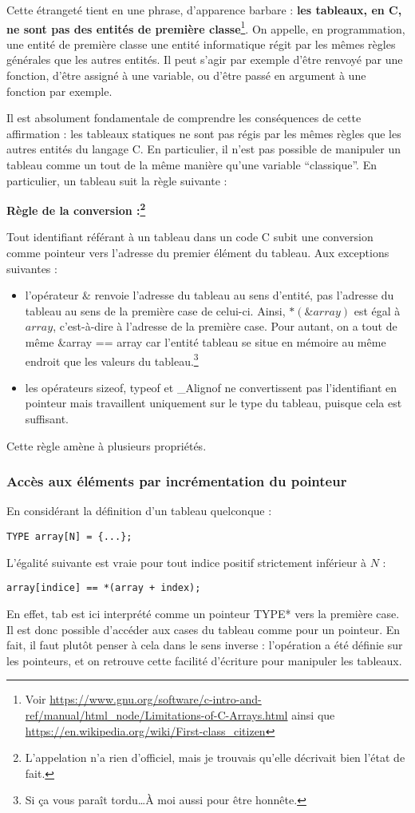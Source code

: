 \documentclass[../../../main.tex]{subfiles}
\begin{document}
Cette étrangeté tient en une phrase, d'apparence barbare : \textbf{les tableaux, en C, ne sont pas des entités de première classe}\footnote{Voir \url{https://www.gnu.org/software/c-intro-and-ref/manual/html_node/Limitations-of-C-Arrays.html} ainsi que \url{https://en.wikipedia.org/wiki/First-class_citizen}}. On appelle, en programmation, une entité de première classe une entité informatique régit par les mêmes règles générales que les autres entités. Il peut s'agir par exemple d'être renvoyé par une fonction, d'être assigné à une variable, ou d'être passé en argument à une fonction par exemple.
 
Il est absolument fondamentale de comprendre les conséquences de cette affirmation : les tableaux statiques ne sont pas régis par les mêmes règles que les autres entités du langage C. En particulier, il n'est pas possible de manipuler un tableau comme un tout de la même manière qu'une variable ``classique''. En particulier, un tableau suit la règle suivante :
 
\textbf{Règle de la conversion :\footnote{L'appelation n'a rien d'officiel, mais je trouvais qu'elle décrivait bien l'état de fait.}}
 
Tout identifiant référant à un tableau dans un code C subit une conversion comme pointeur vers l'adresse du premier élément du tableau. Aux exceptions suivantes :
\begin{itemize}
	\item l'opérateur $\&$ renvoie l'adresse du tableau au sens d'entité, pas l'adresse du tableau au sens de la première case de celui-ci. Ainsi, $*(\&array)$ est égal à $array$, c'est-à-dire à l'adresse de la première case. Pour autant, on a tout de même \textsf{\&array == array} car l'entité tableau se situe en mémoire au même endroit que les valeurs du tableau.\footnote{Si ça vous paraît tordu\dots À moi aussi pour être honnête.}
	\item les opérateurs \textsf{sizeof}, \textsf{typeof} et \textsf{\_Alignof} ne convertissent pas l'identifiant en pointeur mais travaillent uniquement sur le type du tableau, puisque cela est suffisant.
\end{itemize}
Cette règle amène à plusieurs propriétés.
\subsubsection{Accès aux éléments par incrémentation du pointeur}
En considérant la définition d'un tableau quelconque :
\begin{verbatim}
TYPE array[N] = {...};
\end{verbatim}
L'égalité suivante est vraie pour tout indice positif strictement inférieur à $N$ :
\begin{verbatim}
array[indice] == *(array + index);
\end{verbatim}
En effet, \textsf{tab} est ici interprété comme un pointeur \textsf{TYPE*} vers la première case. Il est donc possible d'accéder aux cases du tableau comme pour un pointeur. En fait, il faut plutôt penser à cela dans le sens inverse : l'opération a été définie sur les pointeurs, et on retrouve cette facilité d'écriture pour manipuler les tableaux.
 
\end{document}
